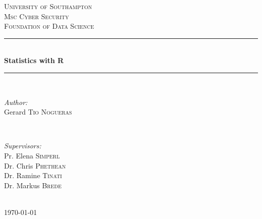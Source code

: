 \documentclass[12pt,twocolumn]{article} %
\begin{document}

\begin{titlepage}

\newcommand{\HRule}{\rule{\linewidth}{0.5mm}} %

\center %

\textsc{\LARGE University of Southampton}\\[1.5cm] %
\textsc{\Large Msc Cyber Security}\\[0.5cm] %
\textsc{\large Foundation of Data Science}\\[0.5cm] %

\HRule \\[0.4cm]
{ \huge \bfseries Statistics with R}\\[0.4cm] %
\HRule \\[1.5cm]

\begin{minipage}{0.4\textwidth}
\begin{flushleft} \large
\emph{Author:}\\
Gerard \textsc{Tio Nogueras} %
\end{flushleft}
\end{minipage}
~
\begin{minipage}{0.4\textwidth}
\begin{flushright} \large
\emph{Supervisors:} \\
Pr. Elena  \textsc{Simperl}\\ %
Dr. Chris \textsc{Phethean}\\
Dr. Ramine \textsc{Tinati}\\
Dr. Markus \textsc{Brede}
\end{flushright}
\end{minipage}\\[4cm]

{\large \today}\\[3cm] %


\vfill %
\end{titlepage}
\newpage
\end{document}
